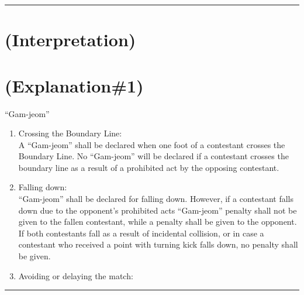 \documentclass[draft]{report}
\renewcommand{\labelenumi}{\arabic{enumi}}
\newenvironment{expl}[0]%
  {\rule{\textwidth}{.2pt}\footnotesize}%
  {\rule{\textwidth}{.2pt}\normalsize}
\begin{document}
\begin{expl}

\section{(Interpretation)}



\section{(Explanation\#1)}
%

``Gam-jeom''

\begin{enumerate}
\def\labelenumi{\roman{enumi}.}
\item
  Crossing the Boundary Line:\\
   A ``Gam-jeom'' shall be declared when one
  foot of a contestant crosses the Boundary Line. No ``Gam-jeom'' will
  be declared if a contestant crosses the boundary line as a result of a
  prohibited act by the opposing contestant.
\item
  Falling down:\\
 ``Gam-jeom'' shall be declared for falling down.
  However, if a contestant falls down due to the opponent's prohibited
  acts ``Gam-jeom'' penalty shall not be given to the fallen contestant,
  while a penalty shall be given to the opponent. If both contestants
  fall as a result of incidental collision, or in case a contestant who
  received a point with turning kick falls down, no penalty shall be
  given.
\item
  Avoiding or delaying the match:


\end{enumerate}
\end{expl}
\end{document}
